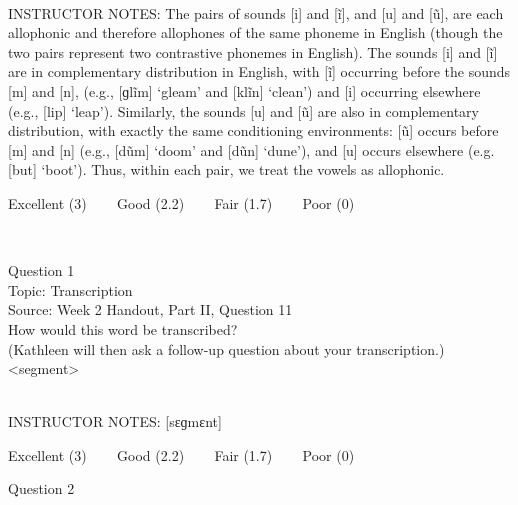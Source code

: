 \documentclass[12pt]{article}
\begin{document}
~\\
INSTRUCTOR NOTES: The pairs of sounds [i] and [ĩ], and [u] and [ũ], are each allophonic and therefore allophones of the same phoneme in English (though the two pairs represent two contrastive phonemes in English). The sounds [i] and [ĩ] are in complementary distribution in English, with [ĩ] occurring before the sounds [m] and [n], (e.g., [ɡlĩm] ‘gleam’ and [klĩn] ‘clean’) and [i] occurring elsewhere (e.g., [lip] ‘leap’). Similarly, the sounds [u] and [ũ] are also in complementary distribution, with exactly the same conditioning environments: [ũ] occurs before [m] and [n] (e.g., [dũm] ‘doom’ and [dũn] ‘dune’), and [u] occurs elsewhere (e.g. [but] ‘boot’). Thus, within each pair, we treat the vowels as allophonic. 


\vfill
Excellent (3) ~~~ Good (2.2) ~~~ Fair (1.7) ~~~ Poor (0)
\newpage

\begin{center}
\textbf{{\color{red}{\HUGE END OF EXAM}}}\\

\end{center}
\newpage

\begin{center}
\textbf{{\color{blue}{\HUGE START OF EXAM\\}}}

\textbf{{\color{blue}{\HUGE Student ID: 17357\\}}}

\textbf{{\color{blue}{\HUGE \\}}}

\end{center}
\newpage

{\large Question 1}\\

Topic: Transcription\\
Source: Week 2 Handout, Part II, Question 11\\

How would this word be transcribed?\\ (Kathleen will then ask a follow-up question about your transcription.)\\

<segment>


~\\
INSTRUCTOR NOTES: [sɛɡmɛnt]


\vfill
Excellent (3) ~~~ Good (2.2) ~~~ Fair (1.7) ~~~ Poor (0)
\newpage

{\large Question 2}\\
\end{document}
